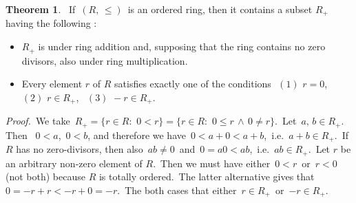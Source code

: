 \documentclass[12pt]{article}
\theoremstyle{definition}
\newtheorem*{thmplain}{Theorem}
\begin{document}
\begin{thmplain}
\, If\, $(R,\,\leq)$\, is an ordered ring, then it contains a subset $R_+$ having the following :
\begin{itemize}
 \item $R_+$ is  under ring addition and, supposing that the ring contains no zero divisors, also under ring multiplication.
 \item Every element $r$ of $R$ satisfies exactly one of the conditions\,\, 
$(1)\,\,r = 0$,\,\,\, $(2)\,\,r\in R_+$,\,\,\, $(3)\,\,-r\in R_+$.
\end{itemize}
\end{thmplain}

{\em Proof.}\, We take\, $R_+ = \{r\in R:\,\, 0 < r\} 
= \{r\in R:\,\, 0\leq r\, \wedge \,0 \neq r\}$.\, Let\, $a,\,b \in R_+$.\, Then \, $0 < a$,\, $0 < b$, and therefore we have\, $0 < a\!+\!0 < a\!+\!b$,\, i.e.\, $a\!+\!b \in R_+$.\, If $R$ has no zero-divisors, then also\, $ab \neq 0$\, and\, $0 = a0 < ab$,\, i.e.\, $ab\in R_+$.\, Let $r$ be an arbitrary non-zero element of $R$.\, Then we must have either\, $0 < r$\, or\, $r < 0$\, (not both) because $R$ is totally ordered.\, The latter alternative gives that\, $0 = -r\!+\!r < -r\!+\!0 = -r$.\, The both cases  that either\, $r\in R_+$\, or\, $-r\in R_+$.
\end{document}
